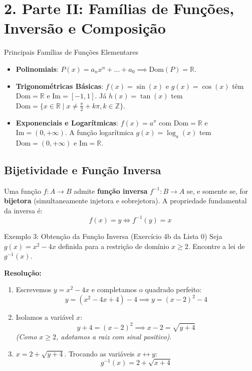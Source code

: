 \documentclass[12pt,a4paper]{article}
\begin{document}
\section*{2. Parte II: Famílias de Funções, Inversão e Composição}

\begin{definicao}{Principais Famílias de Funções Elementares}
    \begin{itemize}
        \item \textbf{Polinomiais}: $P(x) = a_n x^n + \dots + a_0 \implies \text{Dom}(P) = \mathbb{R}$.
        \item \textbf{Trigonométricas Básicas}: $f(x) = \sin(x)$ e $g(x) = \cos(x)$ têm $\text{Dom} = \mathbb{R}$ e $\text{Im} = [-1, 1]$. Já $h(x) = \tan(x)$ tem $\text{Dom} = \{x \in \mathbb{R} \mid x \neq \frac{\pi}{2} + k\pi, k \in \mathbb{Z}\}$.
        \item \textbf{Exponenciais e Logarítmicas}: $f(x) = a^x$ com $\text{Dom} = \mathbb{R}$ e $\text{Im} = (0, +\infty)$. A função logarítmica $g(x) = \log_a(x)$ tem $\text{Dom} = (0, +\infty)$ e $\text{Im} = \mathbb{R}$.
    \end{itemize}
\end{definicao}

\subsection*{Bijetividade e Função Inversa}
Uma função $f: A \to B$ admite \textbf{função inversa} $f^{-1}: B \to A$ se, e somente se, for \textbf{bijetora} (simultaneamente injetora e sobrejetora). A propriedade fundamental da inversa é:
$$f(x) = y \iff f^{-1}(y) = x$$

\begin{exemplo}{Exemplo 3: Obtenção da Função Inversa (Exercício 4b da Lista 0)}
    Seja $g(x) = x^2 - 4x$ definida para a restrição de domínio $x \ge 2$. Encontre a lei de $g^{-1}(x)$.

    \tcblower
    \textbf{Resolução:}
    \begin{enumerate}
        \item Escrevemos $y = x^2 - 4x$ e completamos o quadrado perfeito:
        $$y = (x^2 - 4x + 4) - 4 \implies y = (x - 2)^2 - 4$$
        \item Isolamos a variável $x$:
        $$y + 4 = (x - 2)^2 \implies x - 2 = \sqrt{y + 4}$$
        \textit{(Como $x \ge 2$, adotamos a raiz com sinal positivo)}.
        \item $x = 2 + \sqrt{y + 4}$. Trocando as variáveis $x \leftrightarrow y$:
        $$g^{-1}(x) = 2 + \sqrt{x + 4}$$
    \end{enumerate}
\end{exemplo}
\end{document}
